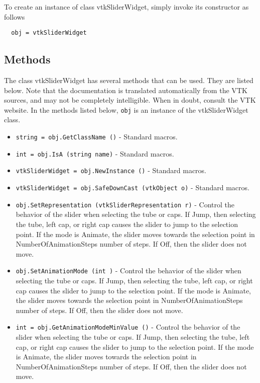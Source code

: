 To create an instance of class vtkSliderWidget, simply
invoke its constructor as follows
\begin{verbatim}
  obj = vtkSliderWidget
\end{verbatim}
\subsection{Methods}

The class vtkSliderWidget has several methods that can be used.
  They are listed below.
Note that the documentation is translated automatically from the VTK sources,
and may not be completely intelligible.  When in doubt, consult the VTK website.
In the methods listed below, \verb|obj| is an instance of the vtkSliderWidget class.
\begin{itemize}
\item  \verb|string = obj.GetClassName ()| -  Standard macros.

\item  \verb|int = obj.IsA (string name)| -  Standard macros.

\item  \verb|vtkSliderWidget = obj.NewInstance ()| -  Standard macros.

\item  \verb|vtkSliderWidget = obj.SafeDownCast (vtkObject o)| -  Standard macros.

\item  \verb|obj.SetRepresentation (vtkSliderRepresentation r)| -  Control the behavior of the slider when selecting the tube or caps. If
 Jump, then selecting the tube, left cap, or right cap causes the slider to
 jump to the selection point. If the mode is Animate, the slider moves
 towards the selection point in NumberOfAnimationSteps number of steps.
 If Off, then the slider does not move.

\item  \verb|obj.SetAnimationMode (int )| -  Control the behavior of the slider when selecting the tube or caps. If
 Jump, then selecting the tube, left cap, or right cap causes the slider to
 jump to the selection point. If the mode is Animate, the slider moves
 towards the selection point in NumberOfAnimationSteps number of steps.
 If Off, then the slider does not move.

\item  \verb|int = obj.GetAnimationModeMinValue ()| -  Control the behavior of the slider when selecting the tube or caps. If
 Jump, then selecting the tube, left cap, or right cap causes the slider to
 jump to the selection point. If the mode is Animate, the slider moves
 towards the selection point in NumberOfAnimationSteps number of steps.
 If Off, then the slider does not move.


\end{itemize}

